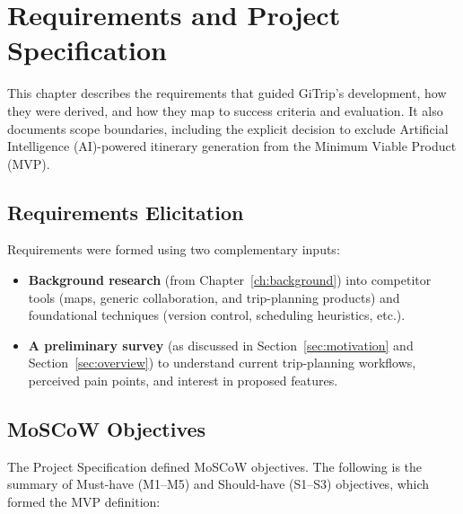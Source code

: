 \chapter{Requirements and Project Specification}
\label{ch:requirements}

This chapter describes the requirements that guided GiTrip's development, how
they were derived, and how they map to success criteria and evaluation. It also
documents scope boundaries, including the explicit decision to exclude Artificial Intelligence (AI)-powered
itinerary generation from the Minimum Viable Product (MVP).

\section{Requirements Elicitation}
Requirements were formed using two complementary inputs:
\begin{itemize}
  \item \textbf{Background research} (from Chapter~\ref{ch:background}) into competitor tools (maps, generic collaboration, and trip-planning products) and foundational techniques (version control, scheduling heuristics, etc.).
  \item \textbf{A preliminary survey} (as discussed in Section~\ref{sec:motivation} and Section~\ref{sec:overview}) to understand current trip-planning workflows, perceived pain points, and interest in proposed features.
\end{itemize}

\section{MoSCoW Objectives}
The Project Specification defined MoSCoW objectives. The following is the summary of Must-have (M1--M5) and Should-have (S1--S3) objectives, which formed the MVP definition:

